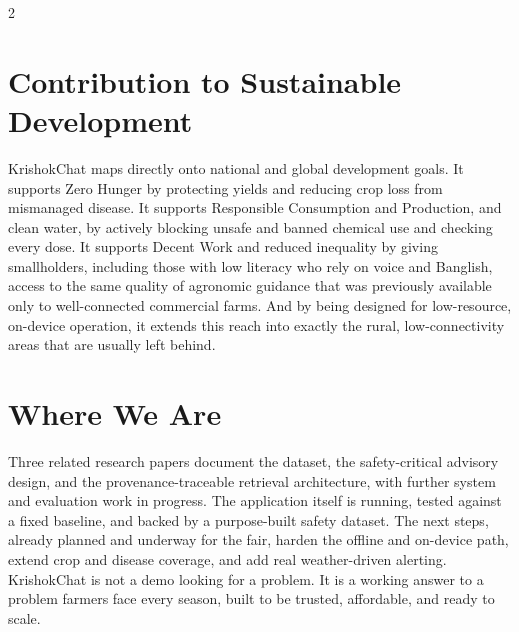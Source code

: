 \documentclass[11pt]{article}
\begin{document}
\begin{multicols}{2}
\section{Contribution to Sustainable Development}

KrishokChat maps directly onto national and global development goals. It supports Zero Hunger by protecting yields and reducing crop loss from mismanaged disease. It supports Responsible Consumption and Production, and clean water, by actively blocking unsafe and banned chemical use and checking every dose. It supports Decent Work and reduced inequality by giving smallholders, including those with low literacy who rely on voice and Banglish, access to the same quality of agronomic guidance that was previously available only to well-connected commercial farms. And by being designed for low-resource, on-device operation, it extends this reach into exactly the rural, low-connectivity areas that are usually left behind.

\section{Where We Are}

Three related research papers document the dataset, the safety-critical advisory design, and the provenance-traceable retrieval architecture, with further system and evaluation work in progress. The application itself is running, tested against a fixed baseline, and backed by a purpose-built safety dataset. The next steps, already planned and underway for the fair, harden the offline and on-device path, extend crop and disease coverage, and add real weather-driven alerting. KrishokChat is not a demo looking for a problem. It is a working answer to a problem farmers face every season, built to be trusted, affordable, and ready to scale.

\end{multicols}
\end{document}
